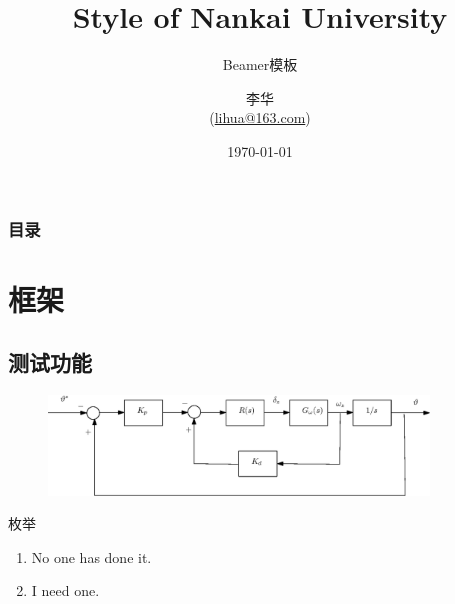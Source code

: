 \documentclass[UTF8]{beamer}
\title[Beamer模板]{Style of Nankai University}
\subtitle{Beamer模板}
\author[李华]{李华\\(\url{lihua@163.com})}
\institute{南开大学XX学院}
\date{\today}
\begin{document}

\renewcommand{\contentsname}{目录}     %
\renewcommand{\abstractname}{摘要}     %
\renewcommand{\refname}{参考文献}      %
\renewcommand{\indexname}{索引}
\renewcommand{\figurename}{图}
\renewcommand{\tablename}{表}
\renewcommand{\appendixname}{附录}
\begin{frame}[plain]
\maketitle
\end{frame}


\begin{frame}
\frametitle{目录}
\tableofcontents
\end{frame}
\section{框架}

\subsection{测试功能}

\begin{frame}
    \begin{figure}
        \centering
        \includegraphics[width=0.9\textwidth]{vart.eps}
    \end{figure}
\end{frame}

\begin{frame}{枚举}
    \begin{enumerate}
        \item No one has done it.
        \item I need one.
    \end{enumerate}
\end{frame}
\end{document}
